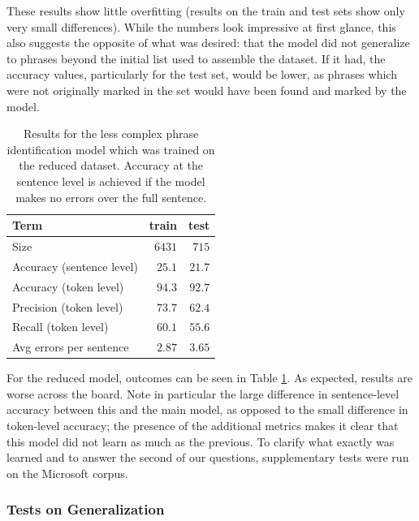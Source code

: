 These results show little overfitting (results on the train and test sets show only very small differences). While the numbers look impressive at first glance, this also suggests the opposite of what was desired: that the model did not generalize to phrases beyond the initial list used to assemble the dataset. If it had, the accuracy values, particularly for the test set, would be lower, as phrases which were not originally marked in the set would have been found and marked by the model.

\begin{table}[h]
\centering
 \begin{tabular}{|| l | r | r ||}
 \hline
 Term & train & test \\ [0.3ex] 
 \hline\hline
 Size & $6431$ & $715$ \\
 \hline
 Accuracy (sentence level) & $25.1$ & $21.7$ \\
 \hline
 Accuracy (token level) & $94.3$ & $92.7$ \\
 \hline
 Precision (token level) & $73.7$ & $62.4$ \\
 \hline
 Recall (token level) & $60.1$ & $55.6$ \\
 \hline
 Avg errors per sentence & $2.87$ & $3.65$ \\
 \hline
\end{tabular}
\caption{Results for the less complex phrase identification model which was trained on the reduced dataset. Accuracy at the sentence level is achieved if the model makes no errors over the full sentence.}
\label{lexical-ident-reduced-results}
\end{table}

For the reduced model, outcomes can be seen in Table \ref{lexical-ident-reduced-results}. As expected, results are worse across the board. Note in particular the large difference in sentence-level accuracy between this and the main model, as opposed to the small difference in token-level accuracy; the presence of the additional metrics makes it clear that this model did not learn as much as the previous. To clarify what exactly was learned and to answer the second of our questions, supplementary tests were run on the Microsoft corpus.

\subsubsection{Tests on Generalization}

